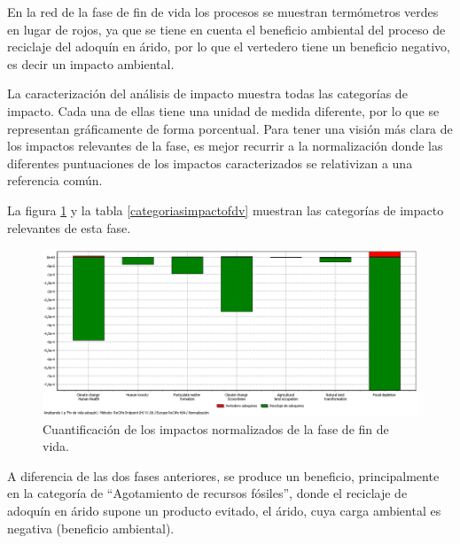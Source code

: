 En la red de la fase de fin de vida los procesos se muestran termómetros verdes en lugar de rojos, ya que se tiene en cuenta el beneficio ambiental del proceso de reciclaje del adoquín en árido, por lo que el vertedero tiene un beneficio negativo, es decir un impacto ambiental.

La caracterización del análisis de impacto muestra todas las categorías de impacto. Cada una de ellas tiene una unidad de medida diferente, por lo que se representan gráficamente de forma porcentual. Para tener una visión más clara de los impactos relevantes de la fase, es mejor recurrir a la normalización donde las diferentes puntuaciones de los impactos caracterizados se relativizan a una referencia común.

La figura \ref{fig:fdv_normalizacion} y la tabla \ref{categoriasimpactofdv} muestran las categorías de impacto relevantes de esta fase.

\begin{figure}[!htb]
\centering
\includegraphics[width=15cm]{img/fdv_normalizacion.png}
\caption{Cuantificación de los impactos normalizados de la fase de fin de vida.}
\label{fig:fdv_normalizacion}
\end{figure}

A diferencia de las dos fases anteriores, se produce un beneficio, principalmente en la categoría de ``Agotamiento de recursos fósiles'', donde el reciclaje de adoquín en árido supone un producto evitado, el árido, cuya carga ambiental es negativa (beneficio ambiental).

